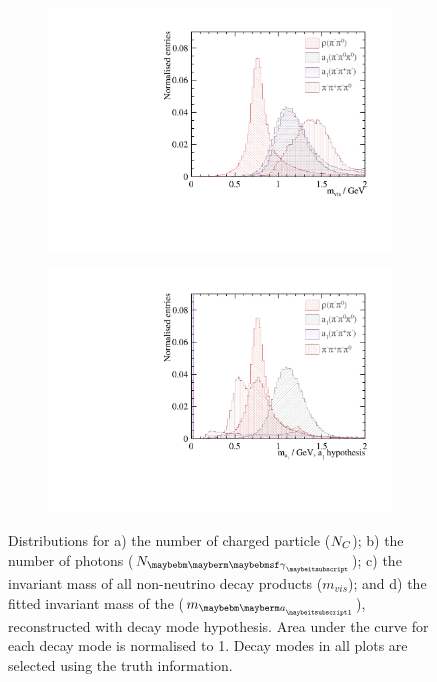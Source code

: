 \begin{figure}[htbp]
\begin{subfigure}[b]{0.45\textwidth}
  \caption{}
  \label{fig:tauVarNPhoton}
\end{subfigure}
\begin{subfigure}[b]{0.45\textwidth}
 \includegraphics[width=\textwidth]{tau/var2/mVis_100GeV_improved_zoom.pdf}
  \caption{}
  \label{fig:tauVarMVis}
\end{subfigure}
\begin{subfigure}[b]{0.45\textwidth}
 \includegraphics[width=\textwidth]{tau/var2/mA1A1Fit_100GeV_improved_zoom.pdf}
  \caption{}
  \label{fig:tauVarMA1}
\end{subfigure}

\caption
{Distributions for a) the number of charged particle (${N}_{C}$); b) the number of photons (${N}_{\Pgg}$); c) the invariant mass of all non-neutrino decay products ($m_{vis}$); and d) the fitted invariant mass of the \Pai ($m_{\Pai}$), reconstructed with \decayAiPhotonShort decay mode hypothesis. Area under the curve for each decay mode is normalised to 1. Decay modes in all plots are selected using the truth information.}
\label{fig:tauVar}
\end{figure}



